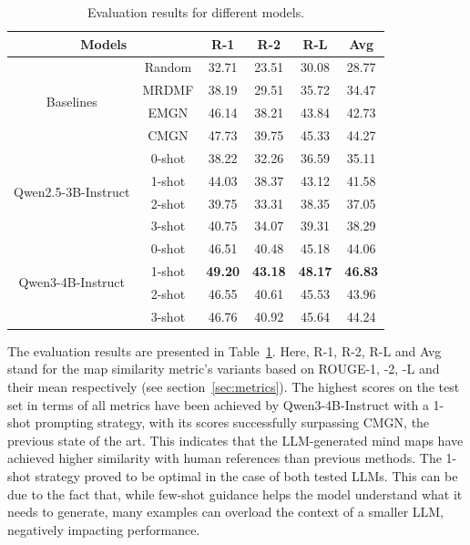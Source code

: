 \documentclass{article}
\begin{document}
\begin{table}[]
    \centering
    \begin{tabular}{c|c|cccc}
        \toprule
        \multicolumn{2}{c}{\textbf{Models}} \vline & \textbf{R-1} & \textbf{R-2} & \textbf{R-L} & \textbf{Avg} \\
        \midrule
        \multirow{4}{*}{Baselines} & Random & 32.71 & 23.51 & 30.08 & 28.77 \\
        & MRDMF & 38.19 & 29.51 & 35.72 & 34.47 \\
        & EMGN & 46.14 & 38.21 & 43.84 & 42.73 \\
        & CMGN & 47.73 & 39.75 & 45.33 & 44.27 \\
        \midrule
        \multirow{4}{*}{Qwen2.5-3B-Instruct} & 0-shot & 38.22 & 32.26 & 36.59 & 35.11 \\
        & 1-shot & 44.03 & 38.37 & 43.12 & 41.58 \\
        & 2-shot & 39.75 & 33.31 & 38.35 & 37.05 \\
        & 3-shot & 40.75 & 34.07 & 39.31 & 38.29 \\
        \midrule
        \multirow{4}{*}{Qwen3-4B-Instruct} & 0-shot & 46.51 & 40.48 & 45.18 & 44.06 \\
        & 1-shot & \textbf{49.20} & \textbf{43.18} & \textbf{48.17} & \textbf{46.83} \\
        & 2-shot & 46.55 & 40.61 & 45.53 & 43.96 \\
        & 3-shot & 46.76 & 40.92 & 45.64 & 44.24 \\
        \bottomrule
    \end{tabular}
    \caption{Evaluation results for different models.}
    \label{tab:evaluation}
\end{table}

The evaluation results are presented in Table~\ref{tab:evaluation}. Here, R-1, R-2, R-L and Avg stand for the map similarity metric's variants based on ROUGE-1, -2, -L and their mean respectively (see section~\ref{sec:metrics}). The highest scores on the test set in terms of all metrics have been achieved by Qwen3-4B-Instruct with a 1-shot prompting strategy, with its scores successfully surpassing CMGN, the previous state of the art. This indicates that the LLM-generated mind maps have achieved higher similarity with human references than previous methods. The 1-shot strategy proved to be optimal in the case of both tested LLMs. This can be due to the fact that, while few-shot guidance helps the model understand what it needs to generate, many examples can overload the context of a smaller LLM, negatively impacting performance.
\end{document}
